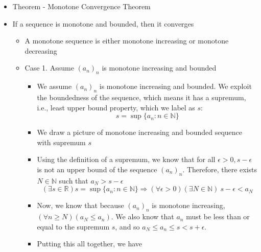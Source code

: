 \documentclass{article}
\begin{document}
\begin{itemize}
    \begin{itemize}
        \item $(\forall n \in \mathbb{N}) \ a_{n+1} = -\frac{1}{n+1} > -\frac{1}{n} = a_n$
        \item Therefore $(a_n)$ strictly monotone increasing
        \item $\forall \epsilon > 0$ we can pick $N \in \mathbb{N}$ such that $N > \frac{1}{\epsilon} \Longleftrightarrow \forall \epsilon > 0$ we can pick $N \in \mathbb{N}$ such that $\frac{1}{N} < \epsilon$. Therefore,
        \[ (\forall \epsilon > 0)(\exists N \in \mathbb{N}) \left\vert - \frac{1}{n} \right\vert < \epsilon \]
        \item So, we have proved that $-\frac{1}{n} \rightarrow 0$
    \end{itemize}
    \item Theorem - Monotone Convergence Theorem
    \item If a sequence is monotone and bounded, then it converges
    \begin{itemize}
        \item A monotone sequence is either monotone increasing or monotone decreasing
        \item Case 1. Assume $(a_n)_n$ is monotone increasing and bounded
        \begin{itemize}
            \item We assume $(a_n)_n$ is monotone increasing and bounded. We exploit the boundedness of the sequence, which means it has a supremum, i.e., least upper bound property, which we label as $s$:
            \[ s = \sup \{ a_n : n \in \mathbb{N} \} \]
            \item We draw a picture of monotone increasing and bounded sequence with supremum $s$
            \item Using the definition of a supremum, we know that for all $\epsilon > 0, s-\epsilon$ is not an upper bound of the sequence $(a_n)_n$. Therefore, there exists $N \in \mathbb{N}$ such that $a_N > s-\epsilon$
            \[ (\exists s \in \mathbb{R}) s = \sup \{ a_n : n \in \mathbb{N} \} \Rightarrow (\forall \epsilon > 0)(\exists N \in \mathbb{N}) \ s - \epsilon < a_N \]
            \item Now, we know that because $(a_n)_n$ is monotone increasing, $(\forall n \ge N)(a_N \le a_n)$. We also know that $a_n$ must be less than or equal to the supremum $s$, and so $a_N \le a_n \le s < s + \epsilon$.
            \item Putting this all together, we have

\end{itemize}
\end{itemize}
\end{itemize}
\end{document}
